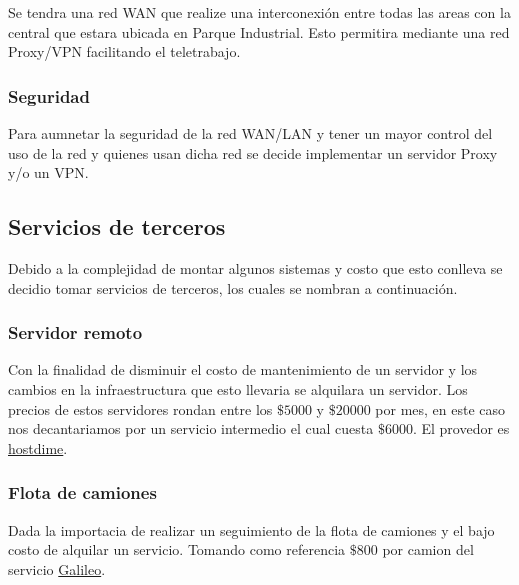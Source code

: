 \documentclass[11pt]{article}
\begin{document}
        Se tendra una red WAN que realize una interconexión entre todas las areas con la central que estara ubicada en Parque Industrial.
        Esto permitira mediante una red Proxy/VPN facilitando el teletrabajo.

        \subsubsection*{Seguridad}

        Para aumnetar la seguridad de la red WAN/LAN y tener un mayor control del uso de la red y quienes usan dicha red 
        se decide implementar un servidor Proxy y/o un VPN.

        \subsection{Servicios de terceros}

        Debido a la complejidad de montar algunos sistemas y costo que esto conlleva se decidio tomar servicios de terceros, los 
        cuales se nombran a continuación.

        \subsubsection*{Servidor remoto}

        Con la finalidad de disminuir el costo de mantenimiento de un servidor y los cambios en la infraestructura que esto llevaria se 
        alquilara un servidor. Los precios de estos servidores rondan entre los $\$5000$ y $\$20000$ por mes, en este 
        caso nos decantariamos por un servicio intermedio el cual cuesta $\$6000$. El provedor es \href{https://www.hostdime.com.ar/servidores-dedicados}{hostdime}.

        \subsubsection*{Flota de camiones}

        Dada la importacia de realizar un seguimiento de la flota de camiones y el bajo costo de alquilar un servicio.
        Tomando como referencia $\$800$ por camion del servicio \href{https://galileosatelital.com/rastreo-vehicular-gps}{Galileo}.
        
        



    
\end{document}
